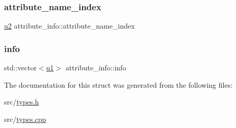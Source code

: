 \subsubsection{\texorpdfstring{attribute\+\_\+name\+\_\+index}{attribute\_name\_index}}
{\footnotesize\ttfamily \hyperlink{types_8h_ae676e9207f57fb921dca7366b2f59c53}{u2} attribute\+\_\+info\+::attribute\+\_\+name\+\_\+index}

\mbox{\label{structattribute__info_a6a539f32a00eeace6eea454ca37768fd}} 
\subsubsection{\texorpdfstring{info}{info}}
{\footnotesize\ttfamily std\+::vector$<$\hyperlink{types_8h_a162f47a77ee24f6f77cd8c82ccd40ab7}{u1}$>$ attribute\+\_\+info\+::info}



The documentation for this struct was generated from the following files\+:\begin{DoxyCompactItemize}
\item 
src/\hyperlink{types_8h}{types.\+h}\item 
src/\hyperlink{types_8cpp}{types.\+cpp}\end{DoxyCompactItemize}
